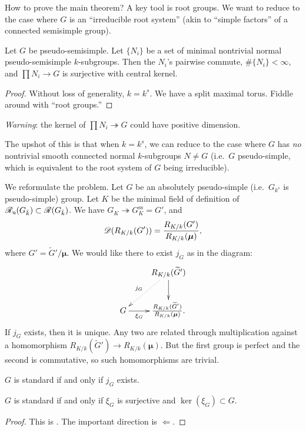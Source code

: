 How to prove the main theorem? A key tool is root groups. We want to reduce to 
the case where $G$ is an ``irreducible root system'' (akin to ``simple 
factors'' of a connected semisimple group). 

\begin{prop}
Let $G$ be pseudo-semisimple. Let $\{N_i\}$ be a set of minimal nontrivial 
normal pseudo-semisimple $k$-subgroups. Then the $N_i$'s pairwise commute, 
$\#\{N_i\}<\infty$, and $\prod N_i \to G$ is surjective with central kernel. 
\end{prop}
\begin{proof}
Without loss of generality, $k=k^s$. We have a split maximal torus. Fiddle 
around with ``root groups.'' 
\end{proof}

\emph{Warning}: the kernel of $\prod N_i \twoheadrightarrow G$ could have 
positive dimension. 

The upshot of this is that when $k=k^s$, we can reduce to the case where $G$ 
has \emph{no} nontrivial smooth connected normal $k$-subgroups $N\ne G$ 
(i.e.~$G$ pseudo-simple, which is equivalent to the root system of $G$ being 
irreducible). 

We reformulate the problem. Let $G$ be an absolutely pseudo-simple (i.e.\ 
$G_{k^s}$ is pseudo-simple) group. Let $K$ be the minimal field of definition 
of $\mathscr{R}_{\mathrm{u}}(G_{\bar k})\subset \mathscr{R}(G_{\bar k})$. We have 
$G_K\twoheadrightarrow G_K^\mathrm{ss}=G'$, and 
\[
  \mathscr{D}(R_{K/k}(G')) = \frac{R_{K/k}(G')}{R_{K/k}(\boldsymbol\mu)} ,
\]
where $G'=\widetilde G'/\boldsymbol\mu$. We would like there to exist 
$j_G$ as in the diagram:
\[\xymatrix{
  & R_{K/k}(\widetilde G') \ar[d] \ar@{.>}[dl]_-{j_G} \\
  G \ar[r]_-{\xi_G} 
    & \frac{R_{K/k}(\widetilde G')}{R_{K/k}(\boldsymbol\mu)} .
}\]
If $j_G$ exists, then it is unique. Any two are related through multiplication 
against a homomorphism $R_{K/k}(\widetilde G') \to R_{K/k}(\boldsymbol\mu)$. 
But the first group is perfect and the second is commutative, so such 
homomorphisms are trivial. 

\begin{lemm}
$G$ is standard if and only if $j_G$ exists. 
\end{lemm}

\begin{theo}
$G$ is standard if and only if $\xi_G$ is surjective and $\ker(\xi_G)\subset G$. 
\end{theo}
\begin{proof}
This is \cite[5.3.8]{cgp10}. The important direction is $\Leftarrow$. 
\end{proof}


